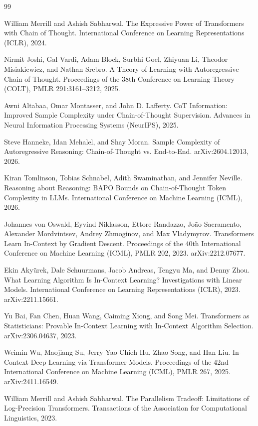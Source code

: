 \documentclass[11pt,a4paper,oneside,openany]{memoir}
\theoremstyle{definition}
\begin{document}
\begin{thebibliography}{99}

William Merrill and Ashish Sabharwal.
\newblock The Expressive Power of Transformers with Chain of Thought.
\newblock International Conference on Learning Representations (ICLR), 2024.

Nirmit Joshi, Gal Vardi, Adam Block, Surbhi Goel, Zhiyuan Li, Theodor Misiakiewicz, and Nathan Srebro.
\newblock A Theory of Learning with Autoregressive Chain of Thought.
\newblock Proceedings of the 38th Conference on Learning Theory (COLT), PMLR 291:3161--3212, 2025.

Awni Altabaa, Omar Montasser, and John D. Lafferty.
\newblock CoT Information: Improved Sample Complexity under Chain-of-Thought Supervision.
\newblock Advances in Neural Information Processing Systems (NeurIPS), 2025.

Steve Hanneke, Idan Mehalel, and Shay Moran.
\newblock Sample Complexity of Autoregressive Reasoning: Chain-of-Thought vs. End-to-End.
\newblock arXiv:2604.12013, 2026.

Kiran Tomlinson, Tobias Schnabel, Adith Swaminathan, and Jennifer Neville.
\newblock Reasoning about Reasoning: BAPO Bounds on Chain-of-Thought Token Complexity in LLMs.
\newblock International Conference on Machine Learning (ICML), 2026.

Johannes von Oswald, Eyvind Niklasson, Ettore Randazzo, Jo\~ao Sacramento, Alexander Mordvintsev, Andrey Zhmoginov, and Max Vladymyrov.
\newblock Transformers Learn In-Context by Gradient Descent.
\newblock Proceedings of the 40th International Conference on Machine Learning (ICML), PMLR 202, 2023. arXiv:2212.07677.

Ekin Aky\"urek, Dale Schuurmans, Jacob Andreas, Tengyu Ma, and Denny Zhou.
\newblock What Learning Algorithm Is In-Context Learning? Investigations with Linear Models.
\newblock International Conference on Learning Representations (ICLR), 2023. arXiv:2211.15661.

Yu Bai, Fan Chen, Huan Wang, Caiming Xiong, and Song Mei.
\newblock Transformers as Statisticians: Provable In-Context Learning with In-Context Algorithm Selection.
\newblock arXiv:2306.04637, 2023.

Weimin Wu, Maojiang Su, Jerry Yao-Chieh Hu, Zhao Song, and Han Liu.
\newblock In-Context Deep Learning via Transformer Models.
\newblock Proceedings of the 42nd International Conference on Machine Learning (ICML), PMLR 267, 2025. arXiv:2411.16549.

William Merrill and Ashish Sabharwal.
\newblock The Parallelism Tradeoff: Limitations of Log-Precision Transformers.
\newblock Transactions of the Association for Computational Linguistics, 2023.

\end{thebibliography}
\end{document}
